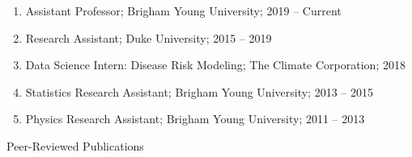 \documentclass[11pt]{article}
\newcommand{\head}[1]{ %
    \bigskip %
    \begin{large}\begin{bf}{#1}\end{bf}\end{large} %

    \ \\ [-1.3cm] %

    \hrulefill}
\begin{document}
\begin{enumerate}[label=$\bullet$]

\item Assistant Professor; Brigham Young University; 2019 -- Current

\item Research Assistant; Duke University; 2015 -- 2019 

\item Data Science Intern: Disease Risk Modeling; The Climate Corporation; 2018

\item Statistics Research Assistant; Brigham Young University; 2013 -- 2015

\item Physics Research Assistant; Brigham Young University; 2011 -- 2013


\end{enumerate}



%


\vspace{2mm}
\head{Peer-Reviewed Publications}
\end{document}
